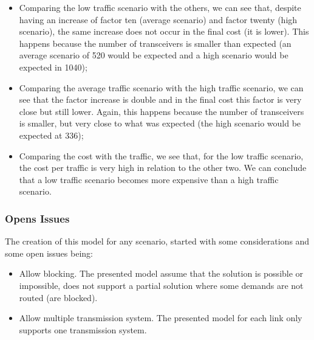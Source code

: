 \begin{itemize}
    \item Comparing the low traffic scenario with the others, we can see that, despite having an increase of factor ten (average scenario) and factor twenty (high scenario), the same increase does not occur in the final cost (it is lower). This happens because the number of transceivers is smaller than expected (an average scenario of 520 would be expected and a high scenario would be expected in 1040);
    \item Comparing the average traffic scenario with the high traffic scenario, we can see that the factor increase is double and in the final cost this factor is very close but still lower. Again, this happens because the number of transceivers is smaller, but very close to what was expected (the high scenario would be expected at 336);
    \item Comparing the cost with the traffic, we see that, for the low traffic scenario, the cost per traffic is very high in relation to the other two. We can conclude that a low traffic scenario becomes more expensive than a high traffic scenario.
\end{itemize}


\vspace{13pt}
\subsubsection{Opens Issues}

The creation of this model for any scenario, started with some considerations and some open issues being:

\begin{itemize}
  \item Allow blocking.
  \subitem The presented model assume that the solution is possible or impossible, does not support a partial solution where some demands are not routed (are blocked).
  \item Allow multiple transmission system.
  \subitem The presented model for each link only supports one transmission system.
\end{itemize}

